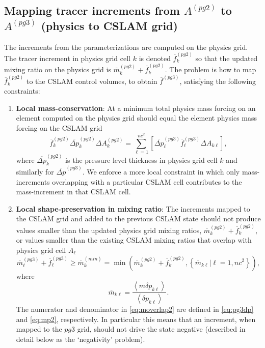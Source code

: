 \documentclass{agujournal}
\begin{document}
\subsection{Mapping tracer increments from $A^{(pg2)}$ to $A^{(pg3)}$ (physics to CSLAM grid)}\label{sec:pgtonc}
The increments from the parameterizations are computed on the physics grid. The tracer increment in physics grid cell $k$ is denoted $\overline{f}_k^{(pg2)}$ so that the updated mixing ratio on the physics grid is ${\overline{m}}^{(pg2)}_k+\overline{f}_k^{(pg2)}$. The problem is how to map $\overline{f}_k^{(pg2)}$ to the CSLAM control volumes, to obtain ${\overline{f}}^{(pg3)}$, satisfying the following constraints:
\begin{enumerate}
\item {\bf{Local mass-conservation}}: At a minimum total physics mass forcing on an element computed on the physics grid should equal the element physics mass forcing on the CSLAM grid
\begin{equation}
{\overline{f}}_k^{(pg2)}{\overline{\Delta p}}^{(pg2)}_k\Delta A_k^{(pg2)}=\sum_{\ell=1}^{nc^2}\left[{\overline{\Delta p}}^{(pg3)}_\ell {\overline{f}}^{(pg3)}_\ell\Delta A_{k\ell}\right],
\end{equation}
where $\overline{\Delta p}^{(pg2)}_k$ is the pressure level thickness in physics grid cell $k$ and similarly for $\overline{\Delta p}^{(pg3)}$. We enforce a more local constraint in which only mass-increments overlapping with a particular CSLAM cell contributes to the mass-increment in that CSLAM cell.
\item {\bf{Local shape-preservation in mixing ratio}}: The increments mapped to the CSLAM grid and added to the previous CSLAM state should not produce values smaller than the updated physics grid mixing ratios, ${\overline{m}}^{(pg2)}_k+\overline{f}_k^{(pg2)}$, or values smaller than the existing CSLAM mixing ratios that overlap with physics grid cell $A_\ell$
\begin{equation}
\label{eq:min}
\overline{m}^{(pg3)}_\ell+{\overline{f}}^{(pg3)}_\ell \ge \overline{m}^{(min)}_k=\min \left( {\overline{m}}^{(pg2)}_k+{\overline{f}}_k^{(pg2)},\left\{ {\overline{m}}_{k\ell} |\ell=1,nc^2\right\} \right),
\end{equation}
where
\begin{equation}
\label{eq:moverlap2}
\overline{m}_{k\ell}=\frac{\left< m\delta p_{k\ell}\right> }{\left< \delta p_{k\ell}\right>}.
\end{equation}
The numerator and denominator in \eqref{eq:moverlap2} are defined in \eqref{eq:pg3dp} and \eqref{eq:mp2}, respectively. In particular this means that an increment, when mapped to the $pg3$ grid, should not drive the state negative (described in detail below as the `negativity' problem).


\end{enumerate}
\end{document}
